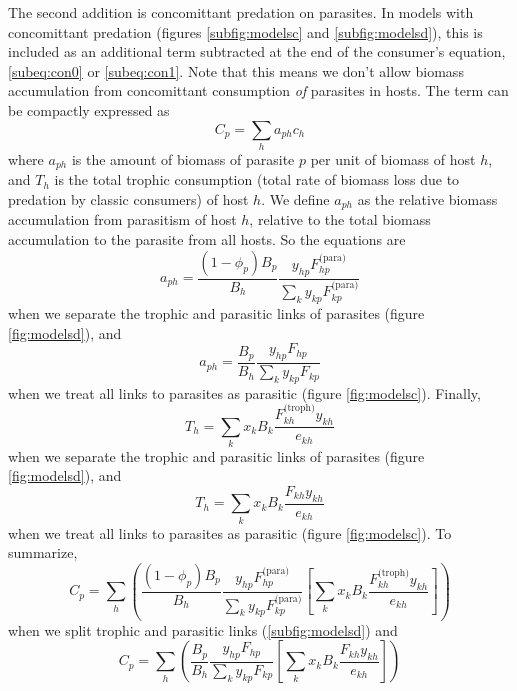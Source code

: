 \documentclass[11pt]{amsart}
\begin{document}
The second addition is concomittant predation on parasites.  In models with concomittant predation (figures \ref{subfig:modelsc} and \ref{subfig:modelsd}), this is included as an additional term subtracted at the end of the consumer's equation, \eqref{subeq:con0} or \eqref{subeq:con1}.  Note that this means we don't allow biomass accumulation from concomittant consumption \textit{of} parasites in hosts.  The term can be compactly expressed as 
\begin{equation}
C_p = \sum_ha_{ph}c_h \label{cp1}
\end{equation}
where $a_{ph}$ is the amount of biomass of parasite $p$ per unit of biomass of host $h$, and $T_h$ is the total trophic consumption (total rate of biomass loss due to predation by classic consumers) of host $h$.  We define $a_{ph}$ as the relative biomass accumulation from parasitism of host $h$, relative to the total biomass accumulation to the parasite from all hosts.  So the equations are 
\begin{equation}
a_{ph} = \frac{(1-\phi_p)B_p}{B_h}\frac{y_{hp}F^\text{(para)}_{hp}}{\sum_{k}y_{kp}F^\text{(para)}_{kp}} \label{aph1}
\end{equation}
when we separate the trophic and parasitic links of parasites (figure \ref{fig:modelsd}), and
\begin{equation}
a_{ph} = \frac{B_p}{B_h}\frac{y_{hp}F_{hp}}{\sum_{k}y_{kp}F_{kp}} \label{aph0}
\end{equation}
when we treat all links to parasites as parasitic (figure \ref{fig:modelsc}).  Finally,
\begin{equation}
T_h = \sum_kx_kB_k\frac{F^\text{(troph)}_{kh}y_{kh}}{e_{kh}} \label{eq:Th1}
\end{equation}
when we separate the trophic and parasitic links of parasites (figure \ref{fig:modelsd}), and
\begin{equation}
T_h = \sum_kx_kB_k\frac{F_{kh}y_{kh}}{e_{kh}} \label{eq:Th1}
\end{equation}
when we treat all links to parasites as parasitic (figure \ref{fig:modelsc}).  To summarize,
\begin{equation}
C_p = \sum_h \left(\frac{(1-\phi_p)B_p}{B_h}\frac{y_{hp}F^\text{(para)}_{hp}}{\sum_{k}y_{kp}F^\text{(para)}_{kp}}\left[\sum_kx_kB_k\frac{F^\text{(troph)}_{kh}y_{kh}}{e_{kh}}\right] \right) \label{cp2}
\end{equation}
when we split trophic and parasitic links (\ref{subfig:modelsd}) and
\begin{equation}
C_p = \sum_h \left(\frac{B_p}{B_h}\frac{y_{hp}F_{hp}}{\sum_{k}y_{kp}F_{kp}}\left[\sum_kx_kB_k\frac{F_{kh}y_{kh}}{e_{kh}}\right] \right) \label{cp2}
\end{equation}
\end{document}
